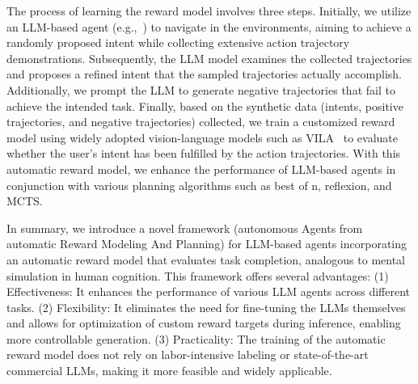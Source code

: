 The process of learning the reward model involves three steps. Initially, we utilize an LLM-based agent (e.g.,~\cite{dubey2024llama3herdmodels}) to navigate in the environments, aiming to achieve a randomly proposed intent while collecting extensive action trajectory demonstrations. Subsequently, the LLM model examines the collected trajectories and proposes a refined intent that the sampled trajectories actually accomplish. Additionally, we prompt the LLM to generate negative trajectories that fail to achieve the intended task. Finally, based on the synthetic data (intents, positive trajectories, and negative trajectories) collected, we train a customized reward model using widely adopted vision-language models such as VILA~\citep{lin2023vila} to evaluate whether the user's intent has been fulfilled by the action trajectories. With this automatic reward model, we enhance the performance of LLM-based agents in conjunction with various planning algorithms such as best of n, reflexion, and MCTS.

In summary, we introduce a novel framework \Model (autonomous Agents from automatic Reward Modeling And Planning) for LLM-based agents incorporating an automatic reward model that evaluates task completion, analogous to mental simulation in human cognition. This framework offers several advantages: (1) Effectiveness: It enhances the performance of various LLM agents across different tasks. (2) Flexibility: It eliminates the need for fine-tuning the LLMs themselves and allows for optimization of custom reward targets during inference, enabling more controllable generation.
(3) Practicality: The training of the automatic reward model does not rely on labor-intensive labeling or state-of-the-art commercial LLMs, making it more feasible and widely applicable.